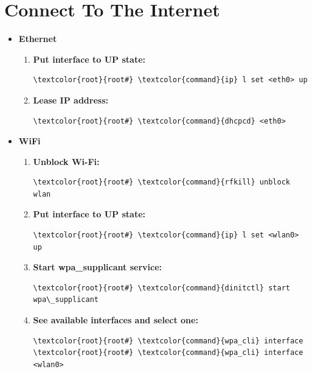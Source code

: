 \documentclass[10pt, a4paper, onecolumn, oneside, titlepage, openany]{book}
\begin{document}
\section{Connect To The Internet}
\begin{itemize}
    \item \textbf{Ethernet}
    \begin{enumerate}
        \item \textbf{Put interface to UP state:}
\begin{Verbatim}[commandchars=\\\{\}]
\textcolor{root}{root#} \textcolor{command}{ip} l set <eth0> up
\end{Verbatim}
        \item \textbf{Lease IP address:}
\begin{Verbatim}[commandchars=\\\{\}]
\textcolor{root}{root#} \textcolor{command}{dhcpcd} <eth0>
\end{Verbatim}
    \end{enumerate}
    \item \textbf{WiFi}
    \begin{enumerate}
        \item \textbf{Unblock Wi-Fi:}
\begin{Verbatim}[commandchars=\\\{\}]
\textcolor{root}{root#} \textcolor{command}{rfkill} unblock wlan
\end{Verbatim}
        \item \textbf{Put interface to UP state:}
\begin{Verbatim}[commandchars=\\\{\}]
\textcolor{root}{root#} \textcolor{command}{ip} l set <wlan0> up
\end{Verbatim}
        \item \textbf{Start wpa\_supplicant service:}
\begin{Verbatim}[commandchars=\\\{\}]
\textcolor{root}{root#} \textcolor{command}{dinitctl} start wpa\_supplicant
\end{Verbatim}
        \item \textbf{See available interfaces and select one:}
\begin{Verbatim}[commandchars=\\\{\}]
\textcolor{root}{root#} \textcolor{command}{wpa_cli} interface
\textcolor{root}{root#} \textcolor{command}{wpa_cli} interface <wlan0>
\end{Verbatim}

\end{enumerate}
\end{itemize}
\end{document}
